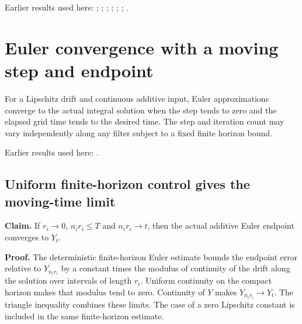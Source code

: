 \documentclass[11pt,a4paper]{report}
\begin{document}
Earlier results used here: \cite[Section~3.22.1]{LangevinLean2026ULASC}; \cite[Section~3.8.11]{LangevinLean2026ULASC}; \cite[Section~3.8.16]{LangevinLean2026ULASC}; \cite[Section~3.8.17]{LangevinLean2026ULASC}; \cite[Section~3.8.19]{LangevinLean2026ULASC}; \cite[Section~3.8.20]{LangevinLean2026ULASC}; \cite[Section~3.8.21]{LangevinLean2026ULASC}.
\section{\texorpdfstring{Euler convergence with a moving step and endpoint}{Euler convergence with a moving step and endpoint}}
\label{proof-module-WassersteinMixing-SemigroupEuler-lean}


For a Lipschitz drift and continuous additive input, Euler approximations converge to the actual integral solution when the step tends to zero and the elapsed grid time tends to the desired time. The step and iteration count may vary independently along any filter subject to a fixed finite horizon bound.



Earlier results used here: \cite[Section~3.16]{LangevinLean2026ULASC}.
\subsection{\texorpdfstring{Uniform finite-horizon control gives the moving-time limit}{Uniform finite-horizon control gives the moving-time limit}}
\label{report-step-WassersteinMixing-SemigroupEuler-lean-1}


\textbf{Claim.} If \(r_i\to0\), \(n_ir_i\le T\) and \(n_ir_i\to t\), then the actual additive Euler endpoint converges to \(Y_t\).



\textbf{Proof.} The deterministic finite-horizon Euler estimate bounds the endpoint error relative to \(Y_{n_ir_i}\) by a constant times the modulus of continuity of the drift along the solution over intervals of length \(r_i\). Uniform continuity on the compact horizon makes that modulus tend to zero. Continuity of \(Y\) makes \(Y_{n_ir_i}\to Y_t\). The triangle inequality combines these limits. The case of a zero Lipschitz constant is included in the same finite-horizon estimate.
\end{document}
